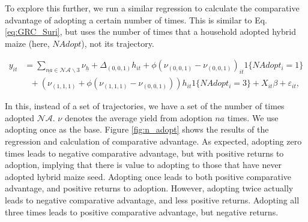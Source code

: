 \documentclass[11pt]{article}
\begin{document}
To explore this further, we run a similar regression to calculate the comparative advantage of adopting a certain number of times. This is similar to Eq. \ref{eq:GRC_Suri}, but uses the number of times that a household adopted hybrid maize (here, $NAdopt$), not its trajectory.

\begin{align}
y_{it}&=\sum_{\underline{na}\in\mathcal{NA}\backslash 3}\nu_{\underline{h}}+\Delta_{(0,0,1)}h_{it}+\phi(\nu_{(0,0,1)}-\nu_{(0,0,1)})_{it}1\{NAdopt_{i}=1\}\nonumber\\
&~~~+\left(\nu_{(1,1,1)}+\phi\left(\nu_{(1,1,1)}-\nu_{(0,0,1)}\right)\right)h_{it}1\{NAdopt_{i}=3\} + X_{it}\beta +\varepsilon_{it},\label{eq:GRC_NAdopt}
\end{align}

In this, instead of a set of trajectories, we have a set of the number of times adopted $\mathcal{NA}$. $\nu$ denotes the average yield from adoption $na$ times. We use adopting once as the base. Figure \ref{fig:n_adopt} shows the results of the regression and calculation of comparative advantage. As expected, adopting zero times leads to negative comparative advantage, but with positive returns to adoption, implying that there is value to adopting to those that have never adopted hybrid maize seed. Adopting once leads to both positive comparative advantage, and positive returns to adoption. However, adopting twice actually leads to negative comparative advantage, and less positive returns. Adopting all three times leads to positive comparative advantage, but negative returns.
\end{document}
